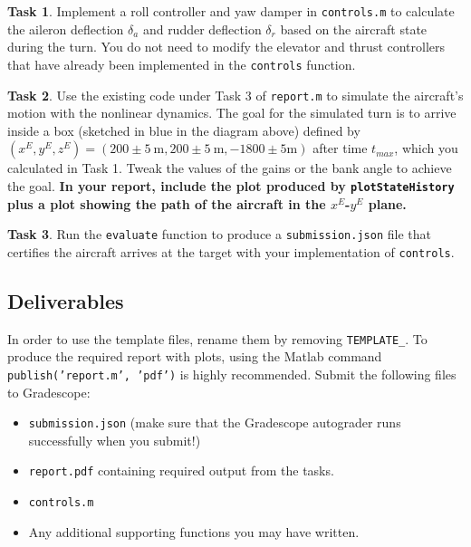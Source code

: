 \documentclass{article}
\theoremstyle{definition}
\newtheorem{task}{Task}
\begin{document}
\begin{task}
    Implement a roll controller and yaw damper in \texttt{controls.m} to calculate the aileron deflection $\delta_a$ and rudder deflection $\delta_r$ based on the aircraft state during the turn. 
You do not need to modify the elevator and thrust controllers that have already been implemented in the \texttt{controls} function.
\end{task}

\begin{task}
    Use the existing code under Task 3 of \texttt{report.m} to simulate the aircraft's motion with the nonlinear dynamics. The goal for the simulated turn is to arrive inside a box (sketched in blue in the diagram above) defined by $(x^E,y^E,z^E) = (200 \pm 5\ \text{m},200 \pm 5\ \text{m}, -1800 \pm 5 \text{m})$ after time $t_{max}$, which you calculated in Task 1. Tweak the values of the gains or the bank angle to achieve the goal.
    \textbf{In your report, include the plot produced by \texttt{plotStateHistory} plus a plot showing the path of the aircraft in the $x^E$-$y^E$ plane.}
\end{task}

\begin{task}
    Run the \texttt{evaluate} function to produce a \texttt{submission.json} file that certifies the aircraft arrives at the target with your implementation of \texttt{controls}.
\end{task}

\subsection*{Deliverables}
In order to use the template files, rename them by removing \texttt{TEMPLATE\_}. To produce the required report with plots, using the Matlab command \texttt{publish('report.m', 'pdf')} is highly recommended. Submit the following files to Gradescope:

\begin{itemize}[noitemsep]
    \item \texttt{submission.json} (make sure that the Gradescope autograder runs successfully when you submit!)
    \item \texttt{report.pdf} containing required output from the tasks.
    \item \texttt{controls.m}
    \item Any additional supporting functions you may have written.
\end{itemize}
\end{document}
